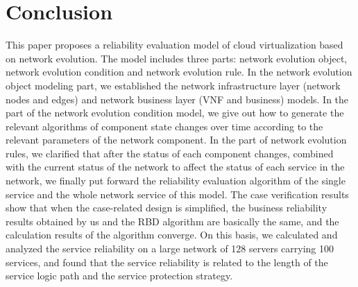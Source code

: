 \documentclass[journal]{IEEEtran}
\begin{document}
    \section{Conclusion}
    This paper proposes a reliability evaluation model of cloud virtualization based on network evolution. The model includes three parts: network evolution object, network evolution condition and network evolution rule. In the network evolution object modeling part, we established the network infrastructure layer (network nodes and edges) and network business layer (VNF and business) models. In the part of the network evolution condition model, we give out how to generate the relevant algorithms of component state changes over time according to the relevant parameters of the network component. In the part of network evolution rules, we clarified that after the status of each component changes, combined with the current status of the network to affect the status of each service in the network, we finally put forward the reliability evaluation algorithm of the single service and the whole network service of this model. The case verification results show that when the case-related design is simplified, the business reliability results obtained by us and the RBD algorithm are basically the same, and the calculation results of the algorithm converge. On this basis, we calculated and analyzed the service reliability on a large network of 128 servers carrying 100 services, and found that the service reliability is related to the length of the service logic path and the service protection strategy.



\end{document}
